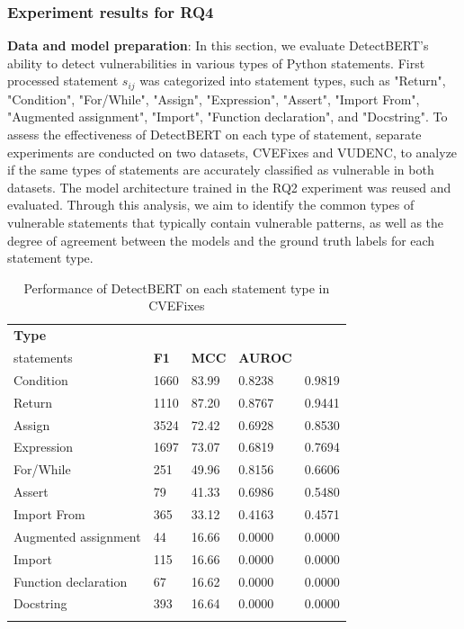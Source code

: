 \documentclass{ieeeaccess}
\begin{document}
\subsubsection{Experiment results for RQ4}\label{sec:RQ4}
\par \textbf{Data and model preparation}: In this section, we evaluate DetectBERT's ability to detect vulnerabilities in various types of Python statements. First processed statement $s_{ij}$  was  categorized into statement types, such as "Return", "Condition", "For/While", "Assign", "Expression", "Assert", "Import From", "Augmented assignment", "Import", "Function declaration", and "Docstring". To assess the effectiveness of DetectBERT on each type of statement, separate experiments are conducted on two datasets, CVEFixes and VUDENC,  to analyze if the same types of statements are accurately classified as vulnerable in both datasets.  The model architecture trained in the RQ2 experiment was reused and evaluated. Through this analysis, we aim to identify the common types of vulnerable statements that typically contain vulnerable patterns, as well as the degree of agreement between the models and the ground truth labels for each statement type. 
\begin{table}[h]
\centering
\begin{tabular}{lllll}
\Xhline{2\arrayrulewidth}
\textbf{Type} & \textbf{\makecell{Number of\\ statements}} &\textbf{F1} & \textbf{MCC} & \textbf{AUROC}\\
\hline
Condition        & 1660 & 83.99 & 0.8238 & 0.9819\\
\rowcolor{gray!15} 
Return           & 1110 & 87.20 & 0.8767 & 0.9441\\
Assign           & 3524 & 72.42 & 0.6928 & 0.8530\\
\rowcolor{gray!15} 
Expression             & 1697 & 73.07 & 0.6819 & 0.7694\\
For/While             & 251  & 49.96 & 0.8156 & 0.6606\\
\rowcolor{gray!15} 
Assert           & 79   & 41.33 & 0.6986 & 0.5480\\
Import From      & 365  & 33.12 & 0.4163 & 0.4571\\
\rowcolor{gray!15} 
Augmented assignment& 44   & 16.66 & 0.0000 & 0.0000\\
Import           & 115  & 16.66 & 0.0000 & 0.0000\\
\rowcolor{gray!15} 
Function declaration & 67  & 16.62 & 0.0000 & 0.0000\\
Docstring        & 393  & 16.64 & 0.0000 & 0.0000\\
\Xhline{2\arrayrulewidth}
\end{tabular}
\caption{Performance of DetectBERT on each statement type in CVEFixes}
\label{table:RQ4_cve}
\end{table}
\end{document}

